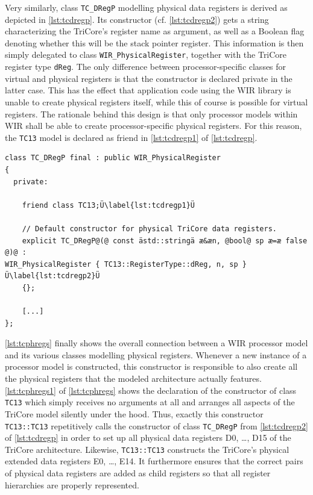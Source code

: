 Very similarly, class \texttt{TC\_DRegP} modelling physical data registers is derived as depicted in \cref{lst:tcdregp}.
Its constructor (cf. \cref{lst:tcdregp2}) gets a string characterizing the TriCore's register name as argument, as well as a Boolean flag denoting whether this will be the stack pointer register.
This information is then simply delegated to class \texttt{WIR\_PhysicalRegister}, together with the TriCore register type \texttt{dReg}.
The only difference between processor-specific classes for virtual and physical registers is that the constructor is declared private in the latter case.
This has the effect that application code using the \gls{WIR} library is unable to create physical registers itself, while this of course is possible for virtual registers.
The rationale behind this design is that only processor models within \gls{WIR} shall be able to create processor-specific physical registers.
For this reason, the \texttt{TC13} model is declared as friend in \cref{lst:tcdregp1} of \cref{lst:tcdregp}.

\begin{lstlisting}[style=code,float=ht,caption={Concrete Modelling of Physical Data Registers (here for TriCore architecture)},label=lst:tcdregp]
class TC_DRegP final : public WIR_PhysicalRegister
{
  private:

    friend class TC13;Ü\label{lst:tcdregp1}Ü

    // Default constructor for physical TriCore data registers.
    explicit TC_DRegP@(@ const ästd::stringä æ&æn, @bool@ sp æ=æ false @)@ :                                                WIR_PhysicalRegister { TC13::RegisterType::dReg, n, sp }Ü\label{lst:tcdregp2}Ü
    {};

    [...]
};
\end{lstlisting}

\cref{lst:tcphregs} finally shows the overall connection between a \gls{WIR} processor model and its various classes modelling physical registers.
Whenever a new instance of a processor model is constructed, this constructor is responsible to also create all the physical registers that the modeled architecture actually features.
\cref{lst:tcphregs1} of \cref{lst:tcphregs} shows the declaration of the constructor of class \texttt{TC13} which simply receives no arguments at all and arranges all aspects of the TriCore model silently under the hood.
Thus, exactly this constructor \texttt{TC13::TC13} repetitively calls the constructor of class \texttt{TC\_DRegP} from \cref{lst:tcdregp2} of \cref{lst:tcdregp} in order to set up all physical data registers D0, \dots, D15 of the TriCore architecture.
Likewise, \texttt{TC13::TC13} constructs the TriCore's physical extended data registers E0, \dots, E14.
It furthermore ensures that the correct pairs of physical data registers are added as child registers so that all register hierarchies are properly represented.

